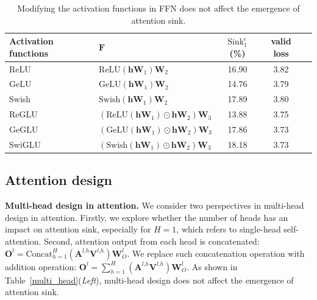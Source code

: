\documentclass{article} \usepackage{iclr2025_conference,times}
\begin{document}
\begin{table}[htbp]
\caption{Modifying the activation functions in FFN does not affect the emergence of attention sink.}
\vspace{-.2cm}
\begin{center}
\begin{tabular}{l|lccc}
\toprule
Activation functions & $\boldsymbol{F}$ & $\textrm{Sink}_1^{\epsilon}$(\%)  & valid loss \\
\midrule
ReLU & $\textrm{ReLU}(\boldsymbol{h}\boldsymbol{W}_1)\boldsymbol{W}_2$ & 16.90 &  3.82\\
GeLU~\citep{hendrycks2016gaussian} & $\textrm{GeLU}(\boldsymbol{h}\boldsymbol{W}_1)\boldsymbol{W}_2$ & 14.76   &  3.79 \\
Swish~\citep{ramachandran2017searching} & $\textrm{Swish}(\boldsymbol{h}\boldsymbol{W}_1)\boldsymbol{W}_2$ &  17.89 & 3.80 \\
ReGLU~\citep{shazeer2020glu} & $\left(\textrm{ReLU}(\boldsymbol{h}\boldsymbol{W}_1)\odot\boldsymbol{h}\boldsymbol{W}_2\right)\boldsymbol{W}_3$ & 13.88  & 3.75\\
GeGLU~\citep{shazeer2020glu} & $\left(\textrm{GeLU}(\boldsymbol{h}\boldsymbol{W}_1)\odot\boldsymbol{h}\boldsymbol{W}_2\right)\boldsymbol{W}_3$ &  17.86 & 3.73\\
SwiGLU~\citep{shazeer2020glu} & $\left(\textrm{Swish}(\boldsymbol{h}\boldsymbol{W}_1)\odot\boldsymbol{h}\boldsymbol{W}_2\right)\boldsymbol{W}_3$ &  18.18 & 3.73\\
\bottomrule
\end{tabular}
\end{center}
\vspace{-.2cm}
\label{activation}
\end{table}

\subsection{Attention design}

\textbf{Multi-head design in attention.} We consider two perspectives in multi-head design in attention. Firstly, we explore whether the number of heads has an impact on attention sink, especially for $H=\textrm{1}$, which refers to single-head self-attention. Second, attention output from each head is concatenated: $\boldsymbol{O}^l=\textrm{Concat}_{h=1}^H\left(\boldsymbol{A}^{l\textrm{,}h}\boldsymbol{V}^{l\textrm{,}h}\right)\boldsymbol{W}_{O}^l$. We replace such concatenation operation with addition operation: $\boldsymbol{O}^l=\sum_{h=1}^H\left(\boldsymbol{A}^{l\textrm{,}h}\boldsymbol{V}^{l\textrm{,}h}\right)\boldsymbol{W}_{O}^l$. As shown in Table~\ref{multi_head}(\emph{Left}), multi-head design does not affect the emergence of attention sink.
\end{document}
